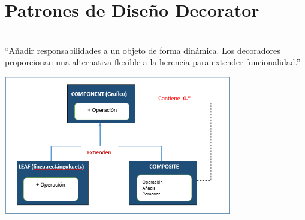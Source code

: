 \section{Patrones de Diseño Decorator} 

\textbf{}\\
“Añadir responsabilidades a un objeto de forma dinámica. Los decoradores proporcionan una alternativa flexible a la herencia para extender funcionalidad.”

\begin{center}
	\includegraphics[width=10cm]{./Imagenes/composite1} 
	\end{center}


